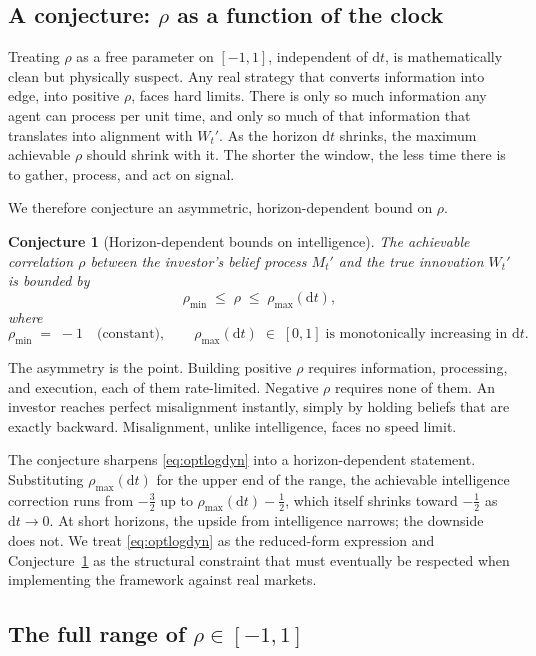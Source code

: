 \documentclass[11pt]{article}
\newtheorem{conjecture}{Conjecture}
\newcommand{\dd}{\mathrm{d}}
\begin{document}
\subsection{A conjecture: $\rho$ as a function of the clock}

Treating $\rho$ as a free parameter on $[-1, 1]$, independent of
$\dd t$, is mathematically clean but physically suspect. Any real
strategy that converts information into edge, into positive $\rho$, faces hard limits. There is only so much information any
agent can process per unit time, and only so much of that information
that translates into alignment with $W_{t}'$. As the horizon $\dd t$
shrinks, the maximum achievable $\rho$ should shrink with it. The
shorter the window, the less time there is to gather, process, and
act on signal.

We therefore conjecture an asymmetric, horizon-dependent bound on
$\rho$.

\begin{conjecture}[Horizon-dependent bounds on intelligence]\label{conj:rhomax}
The achievable correlation $\rho$ between the investor's belief
process $M_{t}'$ and the true innovation $W_{t}'$ is bounded by
\[
  \rho_{\min} \;\leq\; \rho \;\leq\; \rho_{\max}(\dd t),
\]
where
\[
  \rho_{\min} \;=\; -1 \quad\text{(constant)},
  \qquad
  \rho_{\max}(\dd t) \;\in\; [0,1]
  \;\text{is monotonically increasing in } \dd t.
\]
\end{conjecture}

The asymmetry is the point. Building positive $\rho$ requires
information, processing, and execution, each of them rate-limited.
Negative $\rho$ requires none of them. An investor reaches perfect
misalignment instantly, simply by holding beliefs that are exactly
backward. Misalignment, unlike intelligence, faces no speed limit.

The conjecture sharpens \eqref{eq:optlogdyn} into a horizon-dependent
statement. Substituting $\rho_{\max}(\dd t)$ for the upper end of
the range, the achievable intelligence correction runs from
$-\tfrac{3}{2}$ up to $\rho_{\max}(\dd t) - \tfrac{1}{2}$, which
itself shrinks toward $-\tfrac{1}{2}$ as $\dd t \to 0$. At short
horizons, the upside from intelligence narrows; the downside does
not. We treat \eqref{eq:optlogdyn} as the reduced-form expression
and Conjecture~\ref{conj:rhomax} as the structural constraint that
must eventually be respected when implementing the framework against
real markets.

\subsection{The full range of $\rho \in [-1, 1]$}
\end{document}
